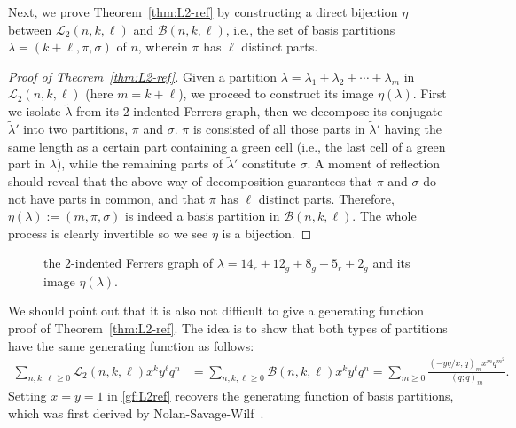 \documentclass[11pt,reqno]{amsart}
\numberwithin{equation}{section}
\theoremstyle{plain}
\theoremstyle{definition}
\newcommand{\B}{\mathcal{B}}
\renewcommand{\L}{\mathcal{L}}
\begin{document}
Next, we prove Theorem~\ref{thm:L2-ref} by constructing a direct bijection $\eta$ between $\L_2(n,k,\ell)$ and $\B(n,k,\ell)$, i.e., the set of basis partitions $\lambda=(k+\ell,\pi,\sigma)$ of $n$, wherein $\pi$ has $\ell$ distinct parts.

\begin{proof}[Proof of Theorem~\ref{thm:L2-ref}]
Given a partition $\lambda=\lambda_1+\lambda_2+\cdots+\lambda_m$ in $\L_2(n,k,\ell)$ (here $m=k+\ell$), we proceed to construct its image $\eta(\lambda)$. First we isolate $\tilde{\lambda}$ from its $2$-indented Ferrers graph, then we decompose its conjugate $\tilde{\lambda}'$ into two partitions, $\pi$ and $\sigma$. $\pi$ is consisted of all those parts in $\tilde{\lambda}'$ having the same length as a certain part containing a green cell (i.e., the last cell of a green part in $\lambda$), while the remaining parts of $\tilde{\lambda}'$ constitute $\sigma$. A moment of reflection should reveal that the above way of decomposition guarantees that $\pi$ and $\sigma$ do not have parts in common, and that $\pi$ has $\ell$ distinct parts. Therefore, $\eta(\lambda):=(m,\pi,\sigma)$ is indeed a basis partition in $\B(n,k,\ell)$. The whole process is clearly invertible so we see $\eta$ is a bijection.
\end{proof}

\begin{figure}[ht]
\begin{ferrers}
\transformto{$\eta$}
\putright
{}
\end{ferrers}
\caption{the $2$-indented Ferrers graph of $\lambda=14_r+12_g+8_g+5_r+2_g$ and its image $\eta(\lambda)$.}
\label{fig:2indent}
\end{figure}

We should point out that it is also not difficult to give a generating function proof of Theorem~\ref{thm:L2-ref}. The idea is to show that both types of partitions have the same generating function as follows:
\begin{align}\label{gf:L2ref}
\sum_{n,k,\ell\ge 0}\L_2(n,k,\ell)x^k y^{\ell} q^n &=\sum_{n,k,\ell\ge 0}\B(n,k,\ell)x^k y^{\ell} q^n= \sum_{m\ge 0}\frac{(-yq/x;q)_m x^{m}q^{m^2}}{(q;q)_m}.
\end{align}
Setting $x=y=1$ in \eqref{gf:L2ref} recovers the generating function of basis partitions, which was first derived by Nolan-Savage-Wilf~\cite[Coro.~2]{NSW}.
\end{document}
